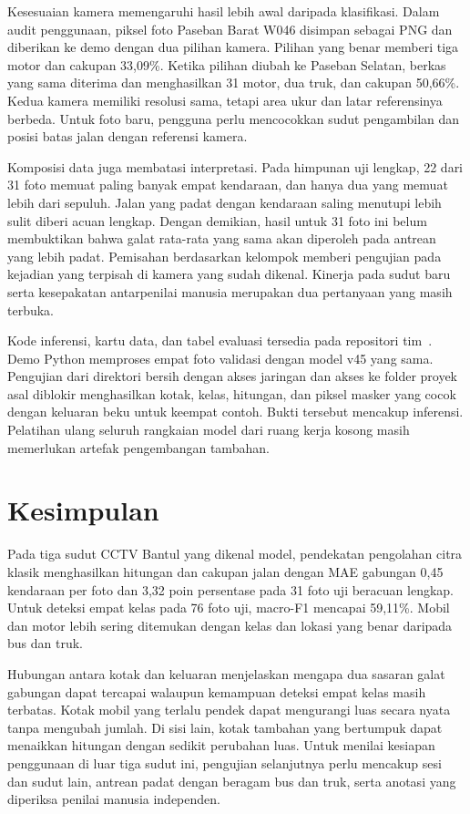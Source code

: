 \documentclass[conference,a4paper]{IEEEtran}
\begin{document}
Kesesuaian kamera memengaruhi hasil lebih awal daripada klasifikasi. Dalam audit penggunaan, piksel foto Paseban Barat W046 disimpan sebagai PNG dan diberikan ke demo dengan dua pilihan kamera. Pilihan yang benar memberi tiga motor dan cakupan 33,09\%. Ketika pilihan diubah ke Paseban Selatan, berkas yang sama diterima dan menghasilkan 31 motor, dua truk, dan cakupan 50,66\%. Kedua kamera memiliki resolusi sama, tetapi area ukur dan latar referensinya berbeda. Untuk foto baru, pengguna perlu mencocokkan sudut pengambilan dan posisi batas jalan dengan referensi kamera.

Komposisi data juga membatasi interpretasi. Pada himpunan uji lengkap, 22 dari 31 foto memuat paling banyak empat kendaraan, dan hanya dua yang memuat lebih dari sepuluh. Jalan yang padat dengan kendaraan saling menutupi lebih sulit diberi acuan lengkap. Dengan demikian, hasil untuk 31 foto ini belum membuktikan bahwa galat rata-rata yang sama akan diperoleh pada antrean yang lebih padat. Pemisahan berdasarkan kelompok memberi pengujian pada kejadian yang terpisah di kamera yang sudah dikenal. Kinerja pada sudut baru serta kesepakatan antarpenilai manusia merupakan dua pertanyaan yang masih terbuka.

Kode inferensi, kartu data, dan tabel evaluasi tersedia pada repositori tim~\cite{repo}. Demo Python memproses empat foto validasi dengan model v45 yang sama. Pengujian dari direktori bersih dengan akses jaringan dan akses ke folder proyek asal diblokir menghasilkan kotak, kelas, hitungan, dan piksel masker yang cocok dengan keluaran beku untuk keempat contoh. Bukti tersebut mencakup inferensi. Pelatihan ulang seluruh rangkaian model dari ruang kerja kosong masih memerlukan artefak pengembangan tambahan.

\section{Kesimpulan}
Pada tiga sudut CCTV Bantul yang dikenal model, pendekatan pengolahan citra klasik menghasilkan hitungan dan cakupan jalan dengan MAE gabungan 0,45 kendaraan per foto dan 3,32 poin persentase pada 31 foto uji beracuan lengkap. Untuk deteksi empat kelas pada 76 foto uji, macro-F1 mencapai 59,11\%. Mobil dan motor lebih sering ditemukan dengan kelas dan lokasi yang benar daripada bus dan truk.

\newpage
Hubungan antara kotak dan keluaran menjelaskan mengapa dua sasaran galat gabungan dapat tercapai walaupun kemampuan deteksi empat kelas masih terbatas. Kotak mobil yang terlalu pendek dapat mengurangi luas secara nyata tanpa mengubah jumlah. Di sisi lain, kotak tambahan yang bertumpuk dapat menaikkan hitungan dengan sedikit perubahan luas. Untuk menilai kesiapan penggunaan di luar tiga sudut ini, pengujian selanjutnya perlu mencakup sesi dan sudut lain, antrean padat dengan beragam bus dan truk, serta anotasi yang diperiksa penilai manusia independen.
\end{document}
